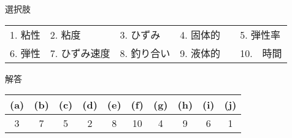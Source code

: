 \documentclass[uplatex,dvipdfmx,a4paper,11pt]{jsarticle}
\begin{document}
\begin{qlist}
\begin{qlist2}
		\end{qlist2}

		\begin{itembox}[l]{選択肢}
			\begin{center}
				\begin{tabular}{lllll}
					1. 粘性	&2. 粘度	&3. ひずみ	&4. 固体的	&5. 弾性率\\
					6. 弾性	&7. ひずみ速度		&8. 釣り合い	&9. 液体的　&10.　時間
				\end{tabular}
			\end{center}
		\end{itembox}
\end{qlist}

\begin{itembox}[l]{解答}
    \begin{center} 
      \begin{tabular}{|c|c|c|c|c|c|c|c|c|c|} \hline
        (a) & (b) & (c) & (d) & (e) & (f) & (g) & (h) & (i) & (j)\\ \hline
        3 & 7 & 5 & 2 & 8 & 10 & 4 & 9 & 6 & 1 \\ \hline		
      \end{tabular}
    \end{center}
\end{itembox}
\end{document}
